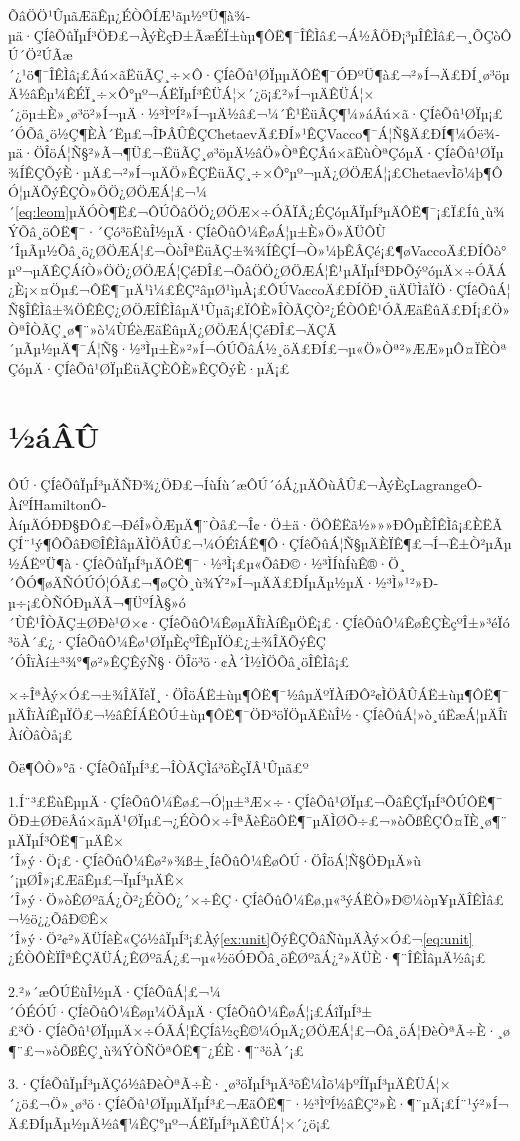 \documentclass[A4,twoside]{ctexart}
\begin{document}
ÕâÖÖ¹ÛµãÆäÊµ¿ÉÒÔÍÆ¹ãµ½ºÜ¶à¾­µä·ÇÍêÕûÏµÍ³ÖÐ£¬ÀýÈçÐ±ÃæÉÏ±ùµ¶ÔË¶¯ÎÊÌâ£¬Á½ÂÖÐ¡³µÎÊÌâ£¬¸ÕÇòÔÚ´Ö²ÚÃæ´¿¹ö¶¯ÎÊÌâ¡£Âú×ãËüÃÇ¸÷×Ô·ÇÍêÕû¹ØÏµµÄÔË¶¯ÓÐºÜ¶à£¬²»Í¬Ä£ÐÍ¸ø³öµÄ½âÊµ¼ÊÉÏ¸÷×Ô°µº¬ÁËÏµÍ³ÊÜÁ¦×´¿ö¡£²»Í¬µÄÊÜÁ¦×´¿öµ±È»¸ø³ö²»Í¬µÄ·½³ÌºÍ²»Í¬µÄ½â£¬¼´Ê¹ËüÃÇ¶¼»áÂú×ã·ÇÍêÕû¹ØÏµ¡£´ÓÕâ¸ö½Ç¶ÈÀ´Ëµ£¬ÎÞÂÛÊÇChetaevÄ£ÐÍ»¹ÊÇVacco¶¯Á¦Ñ§Ä£ÐÍ¶¼Óë¾­µä·ÖÎöÁ¦Ñ§²»Ã¬¶Ü£¬ËüÃÇ¸ø³öµÄ½âÖ»ÒªÊÇÂú×ãËùÒªÇóµÄ·ÇÍêÕû¹ØÏµ¾ÍÊÇÕýÈ·µÄ£¬²»Í¬µÄÖ»ÊÇËüÃÇ¸÷×Ô°µº¬µÄ¿ØÖÆÁ¦¡£ChetaevÌõ¼þ¶ÔÓ¦µÄÕýÊÇÒ»ÖÖ¿ØÖÆÁ¦£¬¼´\eqref{eq:leom}µÄÓÒ¶Ë£¬ÔÚÕâÖÖ¿ØÖÆ×÷ÓÃÏÂ¿ÉÇóµÃÏµÍ³µÄÔË¶¯¡£Ï£Íû¸ù¾ÝÕâ¸öÔË¶¯·´Çó³öËùÎ½µÄ·ÇÍêÕûÔ¼ÊøÁ¦µ±È»Ö»ÄÜÔÙ´ÎµÃµ½Õâ¸ö¿ØÖÆÁ¦£¬ÒòÎªËüÃÇ±¾¾ÍÊÇÍ¬Ò»¼þÊÂÇé¡£¶øVaccoÄ£ÐÍÔò°µº¬µÄÊÇÁíÒ»ÖÖ¿ØÖÆÁ¦ÇéÐÎ£¬ÕâÖÖ¿ØÖÆÁ¦Ê¹µÃÏµÍ³ÐÞÕýºóµÄ×÷ÓÃÁ¿È¡×¤Öµ£¬ÔË¶¯µÄ¹ì¼£ÊÇ²âµØ¹ìµÀ¡£ÔÚVaccoÄ£ÐÍÖÐ¸üÄÜÌåÏÖ·ÇÍêÕûÁ¦Ñ§ÎÊÌâ±¾ÖÊÊÇ¿ØÖÆÎÊÌâµÄ¹Ûµã¡£ÏÔÈ»ÎÒÃÇÒ²¿ÉÒÔÊ¹ÓÃÆäËûÄ£ÐÍ¡£Ö»ÒªÎÒÃÇ¸ø¶¨»ò¼ÙÉèÆäËûµÄ¿ØÖÆÁ¦ÇéÐÎ£¬ÄÇÃ´µÃµ½µÄ¶¯Á¦Ñ§·½³Ìµ±È»²»Í¬ÓÚÕâÁ½¸öÄ£ÐÍ£¬µ«Ö»Òª²»ÆÆ»µÔ¤ÏÈÒªÇóµÄ·ÇÍêÕû¹ØÏµËüÃÇÈÔÈ»ÊÇÕýÈ·µÄ¡£


\section{½áÂÛ}
\label{sec:conclusion}

ÔÚ·ÇÍêÕûÏµÍ³µÄÑÐ¾¿ÖÐ£¬ÍùÍù´æÔÚ´óÁ¿µÄÕùÂÛ£¬ÀýÈçLagrangeÔ­ÀíºÍHamiltonÔ­ÀíµÄÓÐÐ§ÐÔ£¬ÐéÎ»ÒÆµÄ¶¨Òå£¬Î¢·Ö±ä·ÖÔËËã½»»»ÐÔµÈÎÊÌâ¡£ÈËÃÇÍ¨¹ý¶ÔÕâÐ©ÎÊÌâµÄÌÖÂÛ£¬¼ÓÉîÁË¶Ô·ÇÍêÕûÁ¦Ñ§µÄÈÏÊ¶£¬Í¬Ê±Ò²µÃµ½ÁËºÜ¶à·ÇÍêÕûÏµÍ³µÄÔË¶¯·½³Ì¡£µ«ÕâÐ©·½³ÌÍùÍùÊ®·Ö¸´ÔÓ¶øÄÑÓÚÓ¦ÓÃ£¬¶øÇÒ¸ù¾Ý²»Í¬µÄÄ£ÐÍµÃµ½µÄ·½³Ì»¹²»Ð­µ÷¡£ÒÑÓÐµÄÃ¬¶ÜºÍÀ§»ó´ÙÊ¹ÎÒÃÇ±ØÐè¹Ø×¢·ÇÍêÕûÔ¼ÊøµÄÎïÀíÊµÖÊ¡£·ÇÍêÕûÔ¼ÊøÊÇÈçºÎ±»³éÏó³öÀ´£¿·ÇÍêÕûÔ¼Êø¹ØÏµÈçºÎÊµÏÖ£¿±¾ÎÄÕýÊÇ´ÓÎïÀí±³¾°¶ø²»ÊÇÊýÑ§·ÖÎö³ö·¢À´Ì½ÌÖÕâ¸öÎÊÌâ¡£

×÷ÎªÀý×Ó£¬±¾ÎÄÏêÏ¸·ÖÎöÁË±ùµ¶ÔË¶¯½âµÄºÏÀíÐÔ²¢ÌÖÂÛÁË±ùµ¶ÔË¶¯µÄÎïÀíÊµÏÖ£¬½âÊÍÁËÔÚ±ùµ¶ÔË¶¯ÖÐ³öÏÖµÄËùÎ½·ÇÍêÕûÁ¦»ò¸úËæÁ¦µÄÎïÀíÒâÒå¡£

Õë¶ÔÒ»°ã·ÇÍêÕûÏµÍ³£¬ÎÒÃÇÌá³öÈçÏÂ¹Ûµã£º

1.Í¨³£ËùËµµÄ·ÇÍêÕûÔ¼Êø£¬Ó¦µ±³Æ×÷·ÇÍêÕû¹ØÏµ£¬ÕâÊÇÏµÍ³ÔÚÔË¶¯ÖÐ±ØÐëÂú×ãµÄ¹ØÏµ£¬¿ÉÒÔ×÷ÎªÃèÊöÔË¶¯µÄÌØÕ÷£¬»òÕßÊÇÔ¤ÏÈ¸ø¶¨µÄÏµÍ³ÔË¶¯µÄÊ×´Î»ý·Ö¡£·ÇÍêÕûÔ¼Êø²»¾ß±¸ÍêÕûÔ¼ÊøÔÚ·ÖÎöÁ¦Ñ§ÖÐµÄ»ù´¡µØÎ»¡£ÆäÊµ£¬ÏµÍ³µÄÊ×´Î»ý·Ö»òÊØºãÁ¿Ò²¿ÉÒÔ¿´×÷ÊÇ·ÇÍêÕûÔ¼Êø,µ«³ýÁËÒ»Ð©¼òµ¥µÄÎÊÌâ£¬½ö¿¿ÕâÐ©Ê×´Î»ý·Ö²¢²»ÄÜÍêÈ«Çó½âÏµÍ³¡£Àý\ref{ex:unit}ÕýÊÇÕâÑùµÄÀý×Ó£¬\eqref{eq:unit}¿ÉÒÔÈÏÎªÊÇÄÜÁ¿ÊØºãÁ¿£¬µ«½öÓÐÕâ¸öÊØºãÁ¿²»ÄÜÈ·¶¨ÎÊÌâµÄ½â¡£

2.²»´æÔÚËùÎ½µÄ·ÇÍêÕûÁ¦£¬¼´ÓÉÓÚ·ÇÍêÕûÔ¼Êøµ¼ÖÂµÄ·ÇÍêÕûÔ¼ÊøÁ¦¡£ÁîÏµÍ³±£³Ö·ÇÍêÕû¹ØÏµµÄ×÷ÓÃÁ¦ÊÇÍâ½çÊ©¼ÓµÄ¿ØÖÆÁ¦£¬Õâ¸öÁ¦ÐèÒªÃ÷È·¸ø¶¨£¬»òÕßÊÇ¸ù¾ÝÒÑÖªÔË¶¯¿ÉÈ·¶¨³öÀ´¡£

3.·ÇÍêÕûÏµÍ³µÄÇó½âÐèÒªÃ÷È·¸ø³öÏµÍ³µÄ³õÊ¼Ìõ¼þºÍÏµÍ³µÄÊÜÁ¦×´¿ö£¬Ö»¸ø³ö·ÇÍêÕû¹ØÏµµÄÏµÍ³£¬ÆäÔË¶¯·½³ÌºÍ½âÊÇ²»È·¶¨µÄ¡£Í¨¹ý²»Í¬Ä£ÐÍµÃµ½µÄ½â¶¼ÊÇ°µº¬ÁËÏµÍ³µÄÊÜÁ¦×´¿ö¡£
\end{document}

